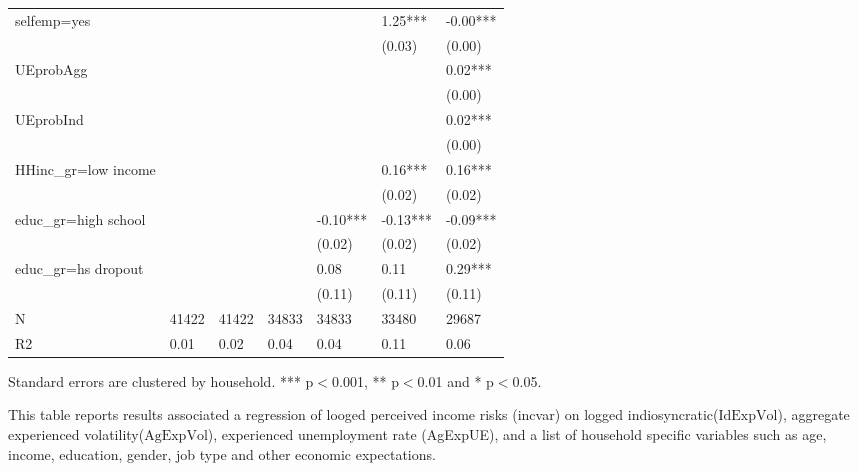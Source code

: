 \begin{table}[p]
\begin{adjustbox}{width=\textwidth}
\begin{threeparttable}
\begin{tabular}{lllllll}
selfemp=yes         &          &           &            &             &      1.25*** &      -0.00*** \\
                    &          &           &            &             &       (0.03) &        (0.00) \\
UEprobAgg           &          &           &            &             &              &       0.02*** \\
                    &          &           &            &             &              &        (0.00) \\
UEprobInd           &          &           &            &             &              &       0.02*** \\
                    &          &           &            &             &              &        (0.00) \\
HHinc\_gr=low income &          &           &            &             &      0.16*** &       0.16*** \\
                    &          &           &            &             &       (0.02) &        (0.02) \\
educ\_gr=high school &          &           &            &    -0.10*** &     -0.13*** &      -0.09*** \\
                    &          &           &            &      (0.02) &       (0.02) &        (0.02) \\
educ\_gr=hs dropout  &          &           &            &        0.08 &         0.11 &       0.29*** \\
                    &          &           &            &      (0.11) &       (0.11) &        (0.11) \\
N                   &    41422 &     41422 &      34833 &       34833 &        33480 &         29687 \\
R2                  &     0.01 &      0.02 &       0.04 &        0.04 &         0.11 &          0.06 \\
\bottomrule
\end{tabular}
\begin{tablenotes}\item Standard errors are clustered by household. *** p$<$0.001, ** p$<$0.01 and * p$<$0.05. 
\item This table reports results associated a regression of looged perceived income risks (incvar) on logged indiosyncratic($\text{IdExpVol}$), aggregate experienced volatility($\text{AgExpVol}$), experienced unemployment rate (AgExpUE), and a list of household specific variables such as age, income, education, gender, job type and other economic expectations.
\end{tablenotes}
\end{threeparttable}
\end{adjustbox}
\end{table}
\clearpage

